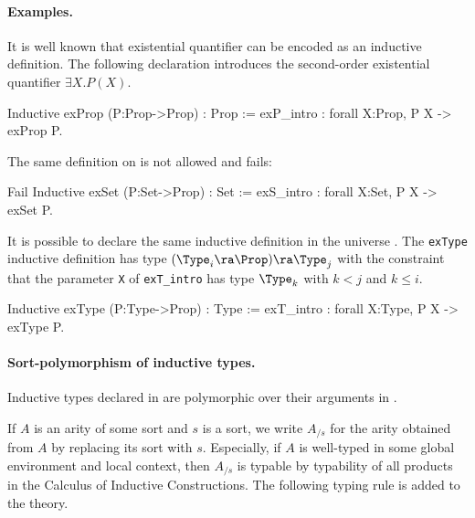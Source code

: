 \paragraph{Examples.}
It is well known that existential quantifier can be encoded as an
inductive definition.
The following declaration introduces the second-order existential
quantifier $\exists X.P(X)$.
\begin{coq_example*}
Inductive exProp (P:Prop->Prop) : Prop 
  := exP_intro : forall X:Prop, P X -> exProp P.
\end{coq_example*}
The same definition on \Set{} is not allowed and fails:
\begin{coq_example}
Fail Inductive exSet (P:Set->Prop) : Set
  := exS_intro : forall X:Set, P X -> exSet P.
\end{coq_example}
It is possible to declare the same inductive definition in the
universe \Type. 
The \texttt{exType} inductive definition has type  $(\Type_i \ra\Prop)\ra
\Type_j$ with the constraint that the parameter \texttt{X} of \texttt{exT\_intro} has type $\Type_k$ with $k<j$ and $k\leq i$.
\begin{coq_example*}
Inductive exType (P:Type->Prop) : Type
  := exT_intro : forall X:Type, P X -> exType P.
\end{coq_example*}

\paragraph[Sort-polymorphism of inductive types.]{Sort-polymorphism of inductive types.}
\label{Sort-polymorphism-inductive}

Inductive types declared in {\Type} are
polymorphic over their arguments in {\Type}.

If $A$ is an arity of some sort and $s$ is a sort, we write $A_{/s}$ for the arity
obtained from $A$ by replacing its sort with $s$. Especially, if $A$
is well-typed in some global environment and local context, then $A_{/s}$ is typable
by typability of all products in the Calculus of Inductive Constructions.
The following typing rule is added to the theory.

